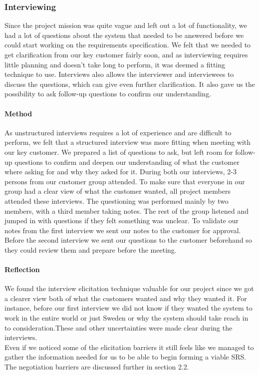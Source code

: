 \documentclass[10pt]{article}
\begin{document}
\subsubsection{Interviewing}
Since the project mission was quite vague and left out a lot of functionality, we had a lot of questions about the system that needed to be answered before we could start working on the requirements specification. We felt that we needed to get clarification from our key customer fairly soon, and as interviewing requires little planning and doesn't take long to perform, it was deemed a fitting technique to use. Interviews also allows the interviewer and interviewees to discuss the questions, which can give even further clarification. It also gave us the possibility to ask follow-up questions to confirm our understanding.

\paragraph{Method}
\hfill \break
As unstructured interviews requires a lot of experience and are difficult to perform, we felt that a structured interview was more fitting when meeting with our key customer. We prepared a list of questions to ask, but left room for follow-up questions to confirm and deepen our understanding of what the customer where asking for and why they asked for it. During both our interviews, 2-3 persons from our customer group attended. To make sure that everyone in our group had a clear view of what the customer wanted, all project members attended these interviews. The questioning was performed mainly by two members, with a third member taking notes. The rest of the group listened and jumped in with questions if they felt something was unclear. To validate our notes from the first interview we sent our notes to the customer for approval. Before the second interview we sent our questions to the customer beforehand so they could review them and prepare before the meeting.

\paragraph{Reflection}
\hfill \break
We found the interview elicitation technique valuable for our project since we got a clearer view both of what the customers wanted and why they wanted it. For instance, before our first interview we did not know  if they wanted the system to work in the entire world or just Sweden or why the system should take reach in to consideration.These and other uncertainties were made clear during the interviews. \\
\indent Even if we noticed some of the elicitation barriers it still feels like we managed to gather the information needed for us to be able to begin forming a viable SRS. The negotiation barriers are discussed further in section 2.2.  
\end{document}
